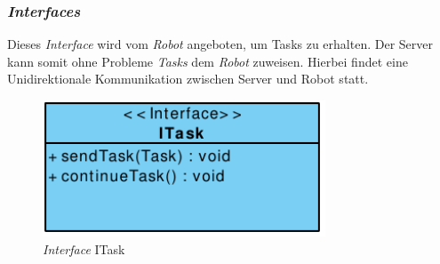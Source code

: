 	\subsubsection{\textit{Interfaces}}
	Dieses \textit{Interface} wird vom \textit{Robot} angeboten, um Tasks zu erhalten. Der Server kann somit ohne Probleme \textit{Tasks} dem \textit{Robot} zuweisen. Hierbei findet eine Unidirektionale Kommunikation zwischen Server und Robot statt.
	\begin{figure}[H]
	\centering
	\includegraphics[width=0.75\textwidth]{img/1-Entwurf-3-1_ITask}
	\caption{\textit{Interface} ITask}
	\label{ITask}
	\end{figure}
